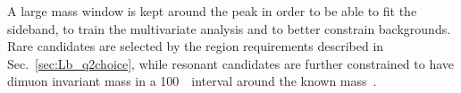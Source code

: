A large mass window is kept around the \Lb peak in order to be able
to fit the sideband, to train the multivariate analysis and to better constrain backgrounds.
Rare candidates are selected by the \qsq region requirements described in Sec.~\ref{sec:Lb_q2choice},
while resonant candidates are further constrained to have dimuon invariant mass
in a 100~\mevcc~interval around the known \jpsi mass~\cite{PDG2014}.

